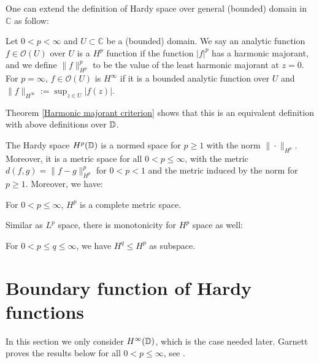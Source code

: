 \begin{remark}
One can extend the definition of Hardy space over general (bounded) domain in $\mathbb{C}$ as follow:
\begin{definition}
Let $0<p<\infty$ and $U\subset \mathbb{C}$ be a (bounded) domain. We say an analytic function $f\in \mathcal{O}(U)$
over $U$ is a $H^p$ function if the function $|f|^p$ has a harmonic majorant, and we define $\|f\|^p_{H^p}$
to be the value of the least harmonic majorant at $z=0$. For $p=\infty$, $f\in \mathcal{O}(U)$ is
$H^\infty$ if it is a bounded analytic function over $U$ and $\|f\|_{H^\infty}:=\sup_{z\in U}|f(z)|$.
\end{definition}
Theorem \ref{Harmonic majorant criterion} shows that this is an equivalent definition with above definitions over $\mathbb{D}$.
\end{remark}


The Hardy space $H^p(\mathbb{D})$ is a normed space for $p\geq 1$ with the
norm $\|\cdot\|_{H^p}$. Moreover, it is a metric space for all $0<p\leq \infty$,
with the metric $d(f,g)=\|f-g\|_{H^p}^p$ for $0<p<1$ and the metric induced by
the norm for $p\geq 1$. Moreover, we have:
\begin{theorem}
For $0<p\leq \infty$, $H^p$ is a complete metric space.
\end{theorem}
Similar as $L^p$ space, there is monotonicity for $H^p$ space as well:
\begin{theorem}
For $0<p\leq q\leq \infty$, we have $H^q\leq H^p$ as subspace.
\end{theorem}


\section{Boundary function of Hardy functions}
In this section we only consider $H^\infty(\mathbb{D})$, which is the case needed later. Garnett proves
the results below for all $0<p\leq\infty$, see \cite[Chapter II]{garnett2006bounded}.


